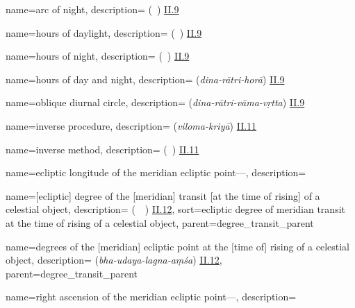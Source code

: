 {
        name={arc of night},
        description={ (\qaws\ \allayl) \hyperlink{Pii9}{II.9}}
}

{
        name={hours of daylight},
        description={ (\saat\ \alnahar) \hyperlink{Pii9}{II.9}}
}

{
        name={hours of night},
        description={ (\saat\ \allayl) \hyperlink{Pii9}{II.9}}
}

{
        name={hours of day and night},
        description={ (\textit{dina-rātri-horā}) \hyperlink{Sii9}{II.9}}
}

{
        name={oblique diurnal circle},
        description={ (\textit{dina-rātri-vāma-vṛtta}) \hyperlink{Sii9}{II.9}}
}


{
        name={inverse procedure},
        description={ (\textit{viloma-kriyā}) \hyperlink{Sii11}{II.11}}
}

{
        name={inverse method},
        description={ (\amal\idafaconsonant\ \aks) \hyperlink{Pii11}{II.11}}
}

{
        name={ecliptic longitude of the meridian ecliptic point---},
        description={\phantom{x}\nopagebreak}
}

{       name={[ecliptic] degree of the [meridian] transit [at the time of rising] of a celestial object},
        description={ (\daraji\idafavowel\ \mamarr\idafaconsonant\ \kawkab) \hyperlink{Pii12}{II.12}},
        sort={ecliptic degree of meridian transit at the time of rising of a celestial object},
        parent={degree_transit_parent}
}

{       name={degrees of the [meridian] ecliptic point at the [time of] rising of a celestial object},
        description={ (\textit{bha-udaya-lagna-aṃśa}) \hyperlink{Sii12}{II.12}},
        parent={degree_transit_parent}
}        

{
        name={right ascension of the meridian ecliptic point---},
        description={\phantom{x}\nopagebreak}
}

